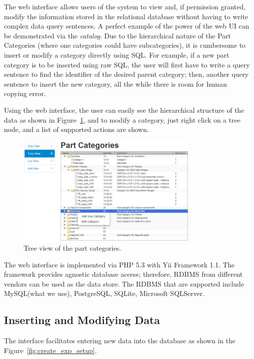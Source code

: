 \documentclass{sig-alternate}
\begin{document}
The web interface allows users of the system to view and, if permission granted, modify the information stored in the relational database without having to write complex data query sentences. A perfect example of the power of the web UI can be demonstrated via the \emph{catalog}. Due to the hierarchical nature of the Part Categories (where one categories could have subcategories), it is cumbersome to insert or modify a category directly using SQL. For example, if a new part category is to be inserted using raw SQL, the user will first have to write a query sentence to find the identifier of the desired parent category; then, another query sentence to insert the new category, all the while there is room for human copying error.

Using the web interface, the user can easily see the hierarchical structure of the data as shown in Figure~\ref{fig:partcat}, and to modify a category, just right click on a tree node, and a list of supported actions are shown.

\begin{figure}[h]
\centering
\includegraphics[width=3.5in]{partcat.pdf}
\caption{Tree view of the part categories.\label{fig:partcat}}
\end{figure}

The web interface is implemented via PHP 5.3 with Yii Framework 1.1. The framework provides agnostic database access; therefore, RDBMS from different vendors can be used as the data store. The RDBMS that are supported include MySQL(what we use), PostgreSQL, SQLite, Microsoft SQLServer.

\subsection{Inserting and Modifying Data}

The interface facilitates entering new data into the database as shown in the Figure~\ref{fig:create_exp_setup}.
\end{document}
